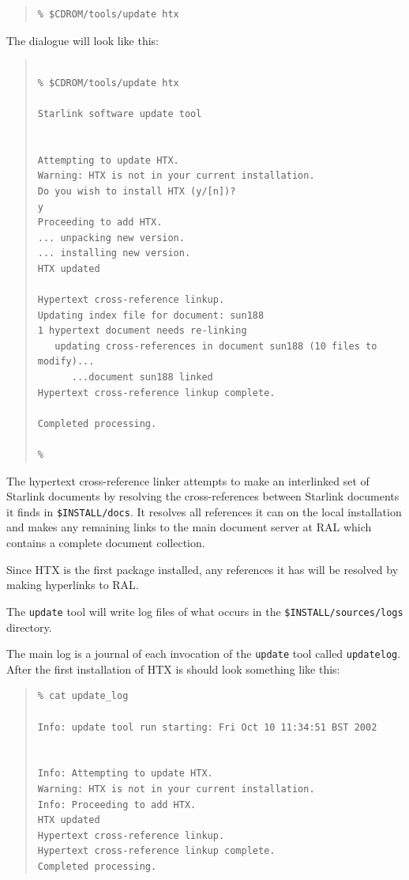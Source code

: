 \documentclass[twoside,11pt]{article}
\renewcommand{\_}{\texttt{\symbol{95}}}
\begin{document}
\begin{quote}
\begin{verbatim}
% $CDROM/tools/update htx
\end{verbatim}
\end{quote}
 
The dialogue will look like this:

\begin{quote}
\begin{verbatim}

% $CDROM/tools/update htx
 
Starlink software update tool
 

Attempting to update HTX.
Warning: HTX is not in your current installation.
Do you wish to install HTX (y/[n])?
y
Proceeding to add HTX.
... unpacking new version.
... installing new version.
HTX updated

Hypertext cross-reference linkup.
Updating index file for document: sun188
1 hypertext document needs re-linking
   updating cross-references in document sun188 (10 files to modify)...
      ...document sun188 linked
Hypertext cross-reference linkup complete.
 
Completed processing.
 
% 
\end{verbatim}
\end{quote}

The hypertext cross-reference linker attempts to make an interlinked
set of Starlink documents by resolving the cross-references between
Starlink documents it finds in \texttt{\$INSTALL/docs}.  It resolves
all references it can on the local installation and makes any remaining
links to the main document server at RAL which contains a complete
document collection.

Since HTX is the first package installed, any references it has will be
resolved by making hyperlinks to RAL.

The \texttt{update} tool will write log files of what occurs in the 
\texttt{\$INSTALL/sources/logs} directory.  

The main log is a journal of each invocation of the \texttt{update} tool
called \texttt{update\_log}.  After the first installation of HTX is
should look something like this: 

\begin{quote}
\begin{verbatim}
% cat update_log
 
Info: update tool run starting: Fri Oct 10 11:34:51 BST 2002
 
 
Info: Attempting to update HTX.
Warning: HTX is not in your current installation.
Info: Proceeding to add HTX.
HTX updated
Hypertext cross-reference linkup.
Hypertext cross-reference linkup complete.
Completed processing.
\end{verbatim}
\end{quote}
\end{document}
